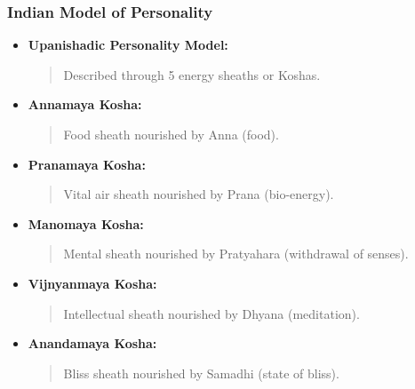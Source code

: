 \begin{frame}[fragile]\frametitle{Indian Model of Personality}

      \begin{itemize}
        \item \textbf{Upanishadic Personality Model:}
        \begin{quote}
        Described through 5 energy sheaths or Koshas.
        \end{quote}
        \item \textbf{Annamaya Kosha:} 
        \begin{quote}
        Food sheath nourished by Anna (food).
        \end{quote}
        \item \textbf{Pranamaya Kosha:}
        \begin{quote}
        Vital air sheath nourished by Prana (bio-energy).
        \end{quote}
        \item \textbf{Manomaya Kosha:}
        \begin{quote}
        Mental sheath nourished by Pratyahara (withdrawal of senses).
        \end{quote}
        \item \textbf{Vijnyanmaya Kosha:}
        \begin{quote}
        Intellectual sheath nourished by Dhyana (meditation).
        \end{quote}
        \item \textbf{Anandamaya Kosha:}
        \begin{quote}
        Bliss sheath nourished by Samadhi (state of bliss).
        \end{quote}
      \end{itemize}

\end{frame}

